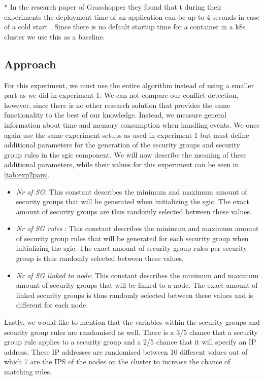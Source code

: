 * In the research paper of Grasshopper they found that t during their experiments the deployment time of an application can be up to 4 seconds in case of a cold start \cite{grashopper}. Since there is no default startup time for a container in a \acrshort{k8s} cluster we use this as a baseline.

\subsection{Approach} \label{exp2:approach}
For this experiment, we must use the entire algorithm instead of using a smaller part as we did in experiment 1. We can not compare our conflict detection, however, since there is no other research solution that provides the same functionality to the best of our knowledge. Instead, we measure general information about time and memory consumption when handling events. We once again use the same experiment setups as used in experiment 1 but must define additional parameters for the generation of the security groups and security group rules in the \acrshort{sgic} component. We will now describe the meaning of these additional parameters, while their values for this experiment can be seen in \autoref{tab:exp2pars}.

\begin{itemize}
    \item \textit{Nr of SG}: This constant describes the minimum and maximum amount of security groups that will be generated when initializing the \acrshort{sgic}. The exact amount of security groups are thus randomly selected between these values.
    \item \textit{Nr of SG rules }: This constant describes the minimum and maximum amount of security group rules that will be generated for each security group when initializing the \acrshort{sgic}. The exact amount of security group rules per security group is thus randomly selected between these values.
    \item \textit{Nr of SG linked to node}: This constant describes the minimum and maximum amount of security groups that will be linked to a node. The exact amount of linked security groups is thus randomly selected between these values and is different for each node.
\end{itemize}

Lastly, we would like to mention that the variables within the security groups and security group rules are randomised as well. There is a 3\slash 5 chance that a security group rule applies to a security group and a 2\slash 5 chance that it will specify an IP address. These IP addresses are randomised between 10 different values out of which 7 are the IPS of the nodes on the cluster to increase the chance of matching rules. 



